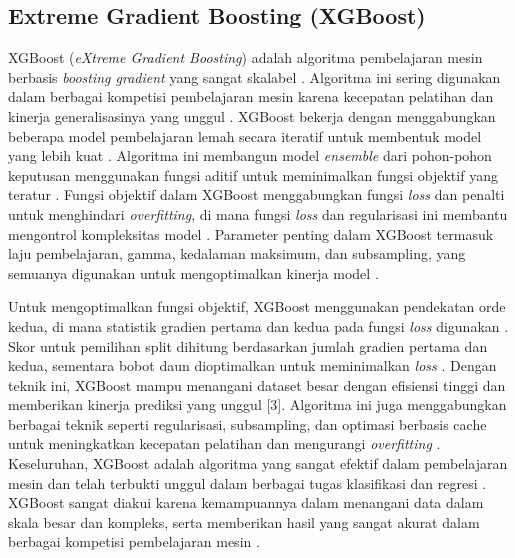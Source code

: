 \documentclass[conference]{IEEEtran}
\begin{document}
\subsection{Extreme Gradient Boosting (XGBoost)}

XGBoost (\textit{eXtreme Gradient Boosting}) adalah algoritma pembelajaran mesin berbasis \textit{boosting gradient} yang sangat skalabel \cite{b25}. Algoritma ini sering digunakan dalam berbagai kompetisi pembelajaran mesin 
karena kecepatan pelatihan dan kinerja generalisasinya yang unggul \cite{b26}. XGBoost bekerja dengan menggabungkan beberapa model pembelajaran lemah secara iteratif untuk membentuk model yang lebih kuat \cite{b26}. 
Algoritma ini membangun model \textit{ensemble} dari pohon-pohon keputusan menggunakan fungsi aditif untuk meminimalkan fungsi objektif yang teratur \cite{b26}. Fungsi objektif dalam XGBoost menggabungkan fungsi 
\textit{loss} dan penalti untuk menghindari \textit{overfitting}, di mana fungsi \textit{loss} dan regularisasi ini membantu mengontrol kompleksitas model \cite{b26}. Parameter penting dalam XGBoost termasuk laju pembelajaran, gamma, 
kedalaman maksimum, dan subsampling, yang semuanya digunakan untuk mengoptimalkan kinerja model \cite{b26}.

Untuk mengoptimalkan fungsi objektif, XGBoost menggunakan pendekatan orde kedua, di mana statistik gradien pertama dan kedua pada fungsi \textit{loss} digunakan \cite{b26}. Skor untuk pemilihan split dihitung berdasarkan 
jumlah gradien pertama dan kedua, sementara bobot daun dioptimalkan untuk meminimalkan \textit{loss} \cite{b26}. Dengan teknik ini, XGBoost mampu menangani dataset besar dengan efisiensi tinggi dan memberikan kinerja 
prediksi yang unggul [3]. Algoritma ini juga menggabungkan berbagai teknik seperti regularisasi, subsampling, dan optimasi berbasis cache untuk meningkatkan kecepatan pelatihan dan mengurangi \textit{overfitting} \cite{b26}. 
Keseluruhan, XGBoost adalah algoritma yang sangat efektif dalam pembelajaran mesin dan telah terbukti unggul dalam berbagai tugas klasifikasi dan regresi \cite{b25}. XGBoost sangat diakui karena kemampuannya 
dalam menangani data dalam skala besar dan kompleks, serta memberikan hasil yang sangat akurat dalam berbagai kompetisi pembelajaran mesin \cite{b25}\cite{b26}.
\end{document}
